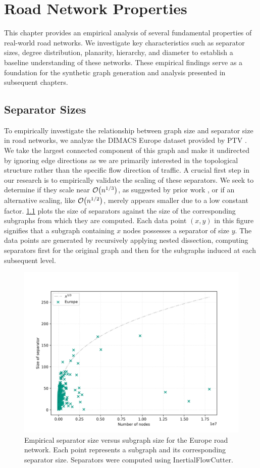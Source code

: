 \chapter{Road Network Properties}
\label{ch:properties}

This chapter provides an empirical analysis of several fundamental properties of real-world road networks.
We investigate key characteristics such as separator sizes, degree distribution, planarity, hierarchy, and diameter to establish a baseline understanding of these networks.
These empirical findings serve as a foundation for the synthetic graph generation and analysis presented in subsequent chapters.

\section{Separator Sizes}
\label{sec:empirical_analysis}

To empirically investigate the relationship between graph size and separator size in road networks, we analyze the DIMACS Europe dataset provided by PTV \cite{ptv_group_dimacs-europe_2009}.
We take the largest connected component of this graph and make it undirected by ignoring edge directions as we are primarily interested in the topological structure rather than the specific flow direction of traffic.
A crucial first step in our research is to empirically validate the scaling of these separators.
We seek to determine if they scale near \(\mathcal{O}\!\left(n^{1/3}\right)\), as suggested by prior work \cite{dibbelt_customizable_2016}, or if an alternative scaling, like \(\mathcal{O}\!\left(n^{1/2}\right)\), merely appears smaller due to a low constant factor.
\cref{fig:separator_size_vs_graph_size} plots the size of separators against the size of the corresponding subgraphs from which they are computed.
Each data point \( (x, y) \) in this figure signifies that a subgraph containing \( x \) nodes possesses a separator of size \( y \).
The data points are generated by recursively applying nested dissection, computing separators first for the original graph and then for the subgraphs induced at each subsequent level.

\begin{figure}[tbhp]
    \centering
    \includegraphics[width=0.6\linewidth]{graphics/Europe.png}
    \caption{Empirical separator size versus subgraph size for the Europe road network. Each point represents a subgraph and its corresponding separator size. Separators were computed using InertialFlowCutter.}
    \label{fig:separator_size_vs_graph_size}
\end{figure}

